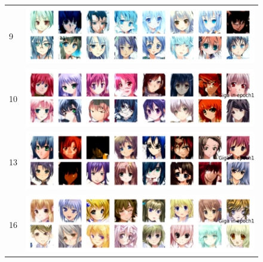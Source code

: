 \documentclass[twocolumn,superscriptaddress,aps]{revtex4-1}
\begin{document}
\begin{figure}[H]
\begin{tabular}{@{}p{.3cm}|p{}@{}}
        9 & \includegraphics[width=\linewidth]{figures/85M_params_GIGA_DDPM_Unet_ckpt_epoch_9.png} \\
        10 & \includegraphics[width=\linewidth]{figures/giga_unet_ddpm_85M_ckpt_epoch_10_epoch_10_samples.png} \\
        13 & \includegraphics[width=\linewidth]{figures/giga_unet_ddpm_85M_ckpt_epoch_13_epoch_13_samples.png} \\
        16 & \includegraphics[width=\linewidth]{figures/giga_unet_ddpm_85M_ckpt_epoch_16_epoch_16_samples.png} \\
        \hline
    \end{tabular}
\end{figure}
\end{document}
